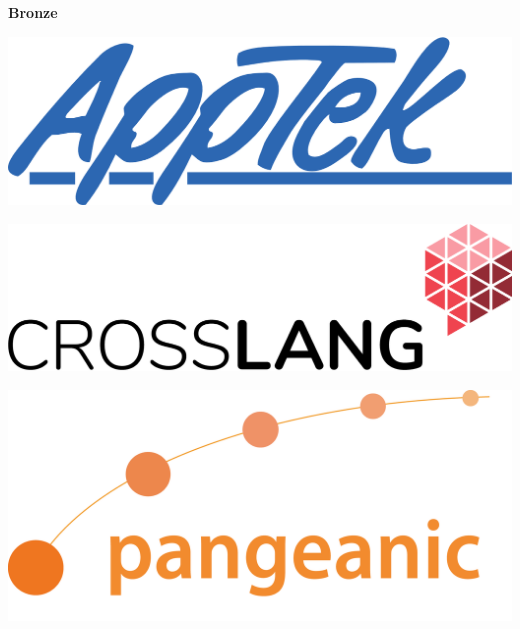 \documentclass[11pt,oneside]{book}
\begin{document}
  \bigskip
  \bigskip
    \begin{samepage}
  \noindent
  {\Large \textbf{Bronze}}

  \nopagebreak
  \begin{minipage}[c][0.21\linewidth][c]{0.17\linewidth}
     \includegraphics[width=\linewidth]{eamt_volume_1/sponsor_logos/media.png}
  \end{minipage}\hspace{0.05\linewidth}
  \begin{minipage}[c][0.21\linewidth][c]{0.17\linewidth}
     \includegraphics[width=\linewidth]{eamt_volume_1/sponsor_logos/CrossLang-logo-RGB-HR.png}
  \end{minipage}\hspace{0.05\linewidth}
   \begin{minipage}[c][0.21\linewidth][c]{0.17\linewidth}
     \includegraphics[width=\linewidth]{eamt_volume_1/sponsor_logos/Logo_Pangeanic_Alta.png}
   \end{minipage}\hspace{0.05\linewidth}
    \begin{minipage}[c][0.21\linewidth][c]{0.17\linewidth}

\end{minipage}
\end{samepage}
\end{document}
